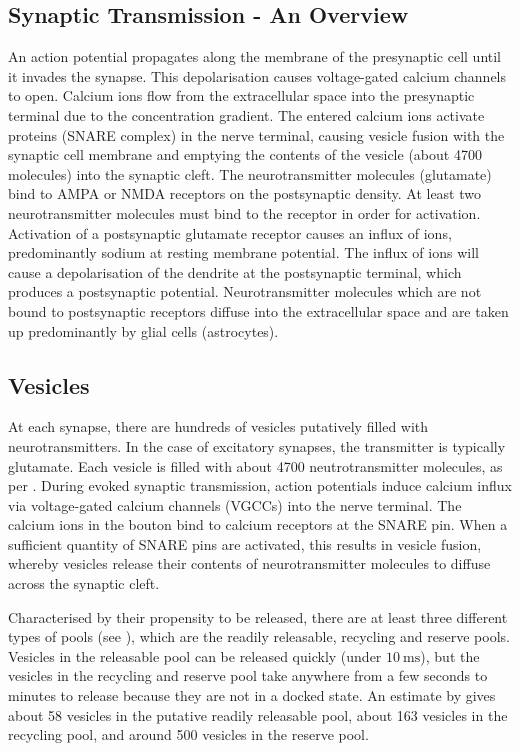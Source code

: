 \documentclass[a4paper]{article}
\begin{document}
\subsection{Synaptic Transmission - An Overview}
An action potential propagates along the membrane of the presynaptic cell until it invades the synapse. This depolarisation causes voltage-gated calcium channels to open. Calcium ions flow from the extracellular space into the presynaptic terminal due to the concentration gradient. The entered calcium ions activate proteins (SNARE complex) in the nerve terminal, causing vesicle fusion with the synaptic cell membrane and emptying the contents of the vesicle (about 4700 molecules) into the synaptic cleft. The neurotransmitter molecules (glutamate) bind to AMPA or NMDA receptors on the postsynaptic density. At least two neurotransmitter molecules must bind to the receptor in order for activation. Activation of a postsynaptic glutamate receptor causes an influx of ions, predominantly sodium at resting membrane potential. The influx of ions will cause a depolarisation of the dendrite at the postsynaptic terminal, which produces a postsynaptic potential. Neurotransmitter molecules which are not bound to postsynaptic receptors diffuse into the extracellular space and are taken up predominantly by glial cells (astrocytes). 


\subsection{Vesicles}
At each synapse, there are hundreds of vesicles putatively filled with neurotransmitters. In the case of excitatory synapses, the transmitter is typically glutamate. Each vesicle is filled with about 4700 neutrotransmitter molecules, as per \cite{Bruns:Nature:1995}. During evoked synaptic transmission, action potentials induce calcium influx via voltage-gated calcium channels (VGCCs) into the nerve terminal. The calcium ions in the bouton bind to calcium receptors at the SNARE pin. When a sufficient quantity of SNARE pins are activated, this results in vesicle fusion, whereby vesicles release their contents of neurotransmitter molecules to diffuse across the synaptic cleft.


Characterised by their propensity to be released, there are at least three different types of pools (see \cite{rizzoli2005synaptic}), which are the readily releasable, recycling and reserve pools. Vesicles in the releasable pool can be released quickly (under $\SI{10}{\milli\second}$), but the vesicles in the recycling and reserve pool take anywhere from a few seconds to minutes to release because they are not in a docked state. An estimate by \cite{Rollehagen::2015} gives about 58 vesicles in the putative readily releasable pool, about 163 vesicles in the recycling pool, and around 500 vesicles in the reserve pool.
\end{document}
